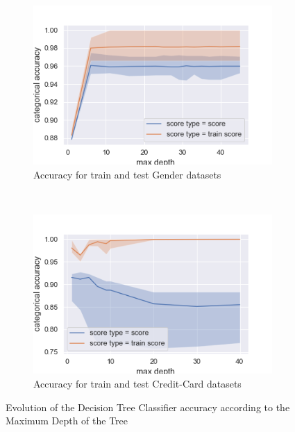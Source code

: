 \documentclass[10pt]{article}
\begin{document}
		\begin{figure}[]
			\centering
			\begin{subfigure}[]{0.45\columnwidth}
				\centering
				\includegraphics[width=\linewidth]{../graphics/tree_gender_max_depth_score_type_score_type.png}
				\caption{Accuracy for train and test Gender datasets}
				\label{tree:gender_train_vs_test}
			\end{subfigure}
			~
			\begin{subfigure}[]{0.45\columnwidth}
				\centering
				\includegraphics[width=\linewidth]{../graphics/tree_creditcard_max_depth_score_type_score_type.png}
				\caption{Accuracy for train and test Credit-Card datasets}
				\label{tree:creditcard_train_vs_test}
			\end{subfigure}
			\caption{Evolution of the Decision Tree Classifier accuracy according to the Maximum Depth of the Tree}
			\label{tree:train_vs_test}
		\end{figure}
\end{document}
